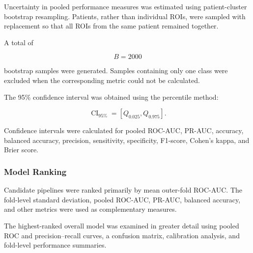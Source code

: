 \documentclass[12pt,twocolumn]{article}
\begin{document}
Uncertainty in pooled performance measures was estimated using
patient-cluster bootstrap resampling. Patients, rather than individual
ROIs, were sampled with replacement so that all ROIs from the same
patient remained together.

A total of

\begin{equation}
B=2000
\label{eq:number_of_bootstraps}
\end{equation}

bootstrap samples were generated. Samples containing only one class
were excluded when the corresponding metric could not be calculated.

The 95\% confidence interval was obtained using the percentile method:

\begin{equation}
\operatorname{CI}_{95\%}
=
\left[
Q_{0.025},
Q_{0.975}
\right].
\label{eq:bootstrap_percentile_ci}
\end{equation}

Confidence intervals were calculated for pooled ROC-AUC, PR-AUC,
accuracy, balanced accuracy, precision, sensitivity, specificity,
F1-score, Cohen's kappa, and Brier score.

\subsubsection{Model Ranking}
\label{subsubsec:model_ranking}

Candidate pipelines were ranked primarily by mean outer-fold ROC-AUC.
The fold-level standard deviation, pooled ROC-AUC, PR-AUC, balanced
accuracy, and other metrics were used as complementary measures.

The highest-ranked overall model was examined in greater detail using
pooled ROC and precision--recall curves, a confusion matrix,
calibration analysis, and fold-level performance summaries.
\end{document}
